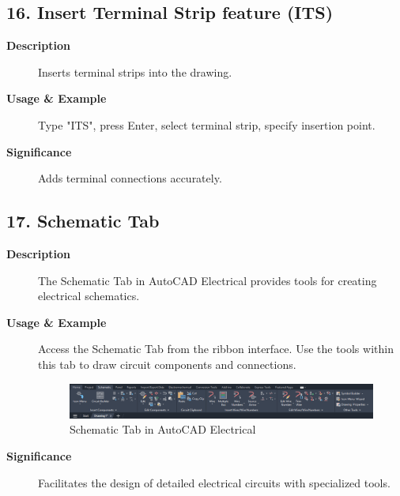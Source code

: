 \documentclass[12pt]{article}
\begin{document}
\subsection*{16. Insert Terminal Strip feature (ITS)}
\begin{description}
    \item [\textbf{Description}] Inserts terminal strips into the drawing.
    \item [\textbf{Usage \& Example}] Type "ITS", press Enter, select terminal strip, specify insertion point.
    \item [\textbf{Significance}] Adds terminal connections accurately.
\end{description}

\subsection*{17. Schematic Tab}
\begin{description}
    \item [\textbf{Description}] The Schematic Tab in AutoCAD Electrical provides tools for creating electrical schematics.
    \item [\textbf{Usage \& Example}] Access the Schematic Tab from the ribbon interface. Use the tools within this tab to draw circuit components and connections.
          \begin{figure}[H]
              \centering
              \includegraphics[width=1\textwidth]{create_schematic_command.png}
              \caption{Schematic Tab in AutoCAD Electrical}
          \end{figure}
    \item [\textbf{Significance}] Facilitates the design of detailed electrical circuits with specialized tools.
\end{description}
\end{document}
